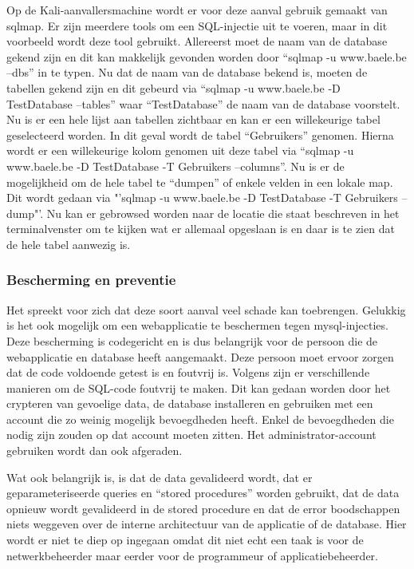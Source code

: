 \documentclass[pdftex,a4paper,12pt]{report}
\begin{document}
Op de Kali-aanvallersmachine wordt er voor deze aanval gebruik gemaakt van sqlmap. Er zijn meerdere tools om een SQL-injectie uit te voeren, maar in dit voorbeeld wordt deze tool gebruikt. Allereerst moet de naam van de database gekend zijn en dit kan makkelijk gevonden worden door "`sqlmap -u www.baele.be --dbs"' in te typen. Nu dat de naam van de database bekend is, moeten de tabellen gekend zijn en dit gebeurd via "`sqlmap -u www.baele.be -D TestDatabase --tables"' waar "`TestDatabase"' de naam van de database voorstelt. Nu is er een hele lijst aan tabellen zichtbaar en kan er een willekeurige tabel geselecteerd worden. In dit geval wordt de tabel "`Gebruikers"' genomen. Hierna wordt er een willekeurige kolom genomen uit deze tabel via "`sqlmap -u www.baele.be -D TestDatabase -T Gebruikers --columns"'. Nu is er de mogelijkheid om de hele tabel te "`dumpen"' of enkele velden in een lokale map. Dit wordt gedaan via "'sqlmap -u www.baele.be -D TestDatabase -T Gebruikers --dump"'. Nu kan er gebrowsed worden naar de locatie die staat beschreven in het terminalvenster om te kijken wat er allemaal opgeslaan is en daar is te zien dat de hele tabel aanwezig is.

\subsubsection{Bescherming en preventie}
Het spreekt voor zich dat deze soort aanval veel schade kan toebrengen. Gelukkig is het ook mogelijk om een webapplicatie te beschermen tegen mysql-injecties. Deze bescherming is codegericht en is dus belangrijk voor de persoon die de webapplicatie en database heeft aangemaakt. Deze persoon moet ervoor zorgen dat de code voldoende getest is en foutvrij is. Volgens \cite{Angus2005} zijn er verschillende manieren om de SQL-code foutvrij te maken. Dit kan gedaan worden door het crypteren van gevoelige data, de database installeren en gebruiken met een account die zo weinig mogelijk bevoegdheden heeft. Enkel de bevoegdheden die nodig zijn zouden op dat account moeten zitten. Het administrator-account gebruiken wordt dan ook afgeraden. \newline

Wat ook belangrijk is, is dat de data gevalideerd wordt, dat er geparameteriseerde queries en "`stored procedures"' worden gebruikt, dat de data opnieuw wordt gevalideerd in de stored procedure en dat de error boodschappen niets weggeven over de interne architectuur van de applicatie of de database. Hier wordt er niet te diep op ingegaan omdat dit niet echt een taak is voor de netwerkbeheerder maar eerder voor de programmeur of applicatiebeheerder. 
\end{document}

